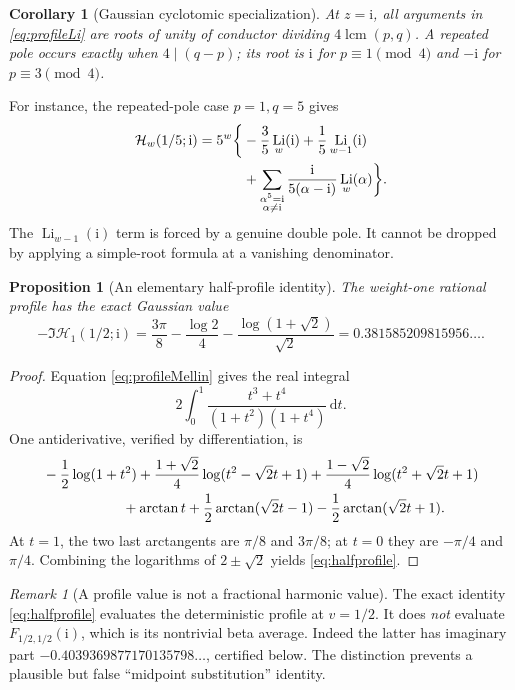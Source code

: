 \documentclass[11pt]{article}
\numberwithin{equation}{section}
\newtheorem{proposition}[theorem]{Proposition}
\newtheorem{corollary}[theorem]{Corollary}
\theoremstyle{definition}\newtheorem{definition}[theorem]{Definition}
\theoremstyle{remark}\newtheorem{remark}[theorem]{Remark}
\DeclareMathOperator{\Li}{Li}
\newcommand{\dd}{\,\mathrm d}
\newcommand{\ii}{\mathrm i}
\newcommand{\HH}{\mathcal H}
\begin{document}
\begin{corollary}[Gaussian cyclotomic specialization]\label{cor:cyclo}
At $z=\ii$, all arguments in \eqref{eq:profileLi} are roots of unity
of conductor dividing $4\operatorname{lcm}(p,q)$. A repeated pole
occurs exactly when $4\mid(q-p)$; its root is $\ii$ for $p\equiv1\pmod4$
and $-\ii$ for $p\equiv3\pmod4$.
\end{corollary}
For instance, the repeated-pole case $p=1,q=5$ gives
\begin{align}\label{eq:resonant15}
 \HH_w(1/5;\ii)=5^w\bigg\{&-\frac35\Li_w(\ii)
       +\frac15\Li_{w-1}(\ii)\notag\\
 &+\sum_{\substack{\alpha^5=\ii\\\alpha\ne\ii}}
       \frac{\ii}{5(\alpha-\ii)}\Li_w(\alpha)\bigg\}.
\end{align}
The $\Li_{w-1}(\ii)$ term is forced by a genuine double pole. It cannot
be dropped by applying a simple-root formula at a vanishing denominator.

\begin{proposition}[An elementary half-profile identity]\label{prop:halfprofile}
The weight-one rational profile has the exact Gaussian value
\begin{equation}\label{eq:halfprofile}
 -\Im\HH_1(1/2;\ii)
 =\frac{3\pi}{8}-\frac{\log2}{4}
       -\frac{\log(1+\sqrt2)}{\sqrt2}
 =0.381585209815956\ldots.
\end{equation}
\end{proposition}
\begin{proof}
Equation \eqref{eq:profileMellin} gives the real integral
\[
 2\int_0^1\frac{t^3+t^4}{(1+t^2)(1+t^4)}\dd t.
\]
One antiderivative, verified by differentiation, is
\begin{align*}
 &-\frac12\log(1+t^2)
 +\frac{1+\sqrt2}{4}\log(t^2-\sqrt2t+1)
 +\frac{1-\sqrt2}{4}\log(t^2+\sqrt2t+1)\\
 &\hspace{20mm}+\arctan t
 +\frac12\arctan(\sqrt2t-1)
 -\frac12\arctan(\sqrt2t+1).
\end{align*}
At $t=1$, the two last arctangents are $\pi/8$ and $3\pi/8$;
at $t=0$ they are $-\pi/4$ and $\pi/4$.
Combining the logarithms of $2\pm\sqrt2$ yields \eqref{eq:halfprofile}.
\end{proof}

\begin{remark}[A profile value is not a fractional harmonic value]
The exact identity \eqref{eq:halfprofile} evaluates the deterministic
profile at $v=1/2$. It does \emph{not} evaluate $F_{1/2,1/2}(\ii)$,
which is its nontrivial beta average. Indeed the latter has imaginary
part $-0.4039369877170135798\ldots$, certified below. The distinction
prevents a plausible but false ``midpoint substitution'' identity.
\end{remark}
\end{document}
